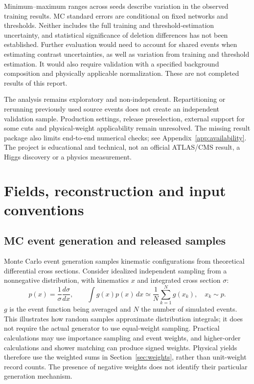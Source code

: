 \documentclass[11pt,a4paper]{article}
\begin{document}
Minimum--maximum ranges across seeds describe variation in the observed training results. MC standard errors are conditional on fixed networks and thresholds.
Neither includes the full training and threshold-estimation uncertainty, and statistical significance of deletion differences has not been established.
Further evaluation would need to account for shared events when estimating contrast uncertainties, as well as variation from training and threshold estimation. It would also require validation with a specified background composition and physically applicable normalization.
These are not completed results of this report.

The analysis remains exploratory and non-independent.
Repartitioning or rerunning previously used source events does not create an independent validation sample.
Production settings, release preselection, external support for some cuts and physical-weight applicability remain unresolved.
The missing result package also limits end-to-end numerical checks; see Appendix~\ref{app:availability}.
The project is educational and technical, not an official ATLAS/CMS result, a Higgs discovery or a physics measurement.

\clearpage
\appendix

\section{Fields, reconstruction and input conventions}\label{app:fields}

\subsection{MC event generation and released samples}\label{app:mc-generation}
Monte Carlo event generation samples kinematic configurations from theoretical differential cross sections.
Consider idealized independent sampling from a nonnegative distribution, with kinematics $x$ and integrated cross section $\sigma$:
\[
 p(x)=\frac{1}{\sigma}\frac{d\sigma}{dx},\qquad
 \int g(x)p(x)\,dx\simeq\frac{1}{N}\sum_{k=1}^{N}g(x_k),\quad x_k\sim p.
\]
$g$ is the event function being averaged and $N$ the number of simulated events.
This illustrates how random samples approximate distribution integrals; it does not require the actual generator to use equal-weight sampling.
Practical calculations may use importance sampling and event weights, and higher-order calculations and shower matching can produce signed weights.
Physical yields therefore use the weighted sums in Section~\ref{sec:weights}, rather than unit-weight record counts.
The presence of negative weights does not identify their particular generation mechanism.
\end{document}

